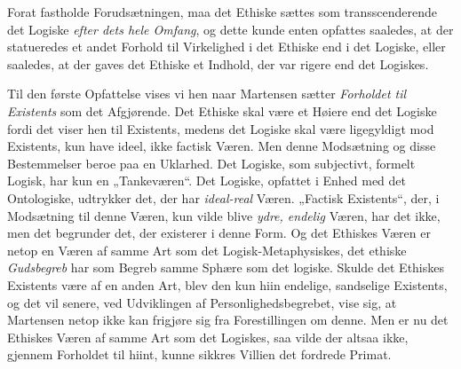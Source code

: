 \documentclass[12pt,a4paper]{book}
\newcommand{\opage}[1]{\marginnote{\footnotesize\textit{[#1]}}}
\begin{document}
Forat fastholde Forudsætningen, maa det Ethiske sættes som transscenderende det
Logiske \emph{efter dets hele Omfang}, og dette kunde enten opfattes saaledes, at
der statueredes et andet Forhold til Virkelighed i det Ethiske end i det Logiske,
eller saaledes, at der gaves det Ethiske et Indhold, der var rigere end det
Logiskes.

Til den første Opfattelse vises vi hen naar Martensen sætter \emph{Forholdet til Existents} som det Afgjørende. Det Ethiske skal være et Høiere end det Logiske fordi
det viser hen til Existents, medens det Logiske skal være lige\opage{59}gyldigt mod
Existents, kun have ideel, ikke factisk Væren. Men denne Modsætning og disse
Bestemmelser beroe paa en Uklarhed. Det Logiske, som subjectivt, formelt Logisk,
har kun en „Tankeværen“. Det Logiske, opfattet i Enhed med det Ontologiske,
udtrykker det, der har \emph{ideal-real} Væren. „Factisk Existents“, der, i Modsætning til
denne Væren, kun vilde blive \emph{ydre, endelig} Væren, har det ikke, men det begrunder
det, der existerer i denne Form. Og det Ethiskes Væren er netop en Væren af samme
Art som det Logisk-Metaphysiskes, det ethiske \emph{Gudsbegreb} har som Begreb samme
Sphære som det logiske. Skulde det Ethiskes Existents være af en anden Art, blev
den kun hiin endelige, sandselige Existents, og det vil senere, ved Udviklingen af
Personlighedsbegrebet, vise sig, at Martensen netop ikke kan frigjøre sig fra
Forestillingen om denne. Men er nu det Ethiskes Væren af samme Art som det Logiskes,
saa vilde der altsaa ikke, gjennem Forholdet til hiint, kunne sikkres Villien det
fordrede Primat.
\end{document}
